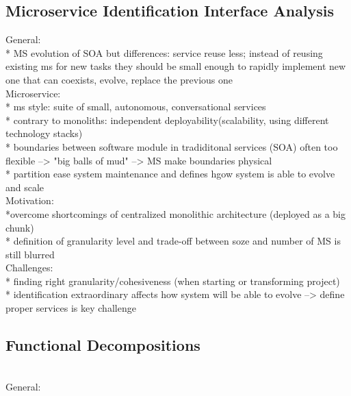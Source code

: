 \subsection{Microservice Identification Interface Analysis}
\cite{interfaceAnalysisBaresi}

General: \\
* MS evolution of SOA but differences: service reuse less; instead of reusing existing ms for new tasks they should be small enough to rapidly implement new one that can coexists, evolve, replace the previous one\\

Microservice:\\
* ms style: suite of small, autonomous, conversational services \\
* contrary to monoliths: independent deployability(scalability, using different technology stacks) \\
* boundaries between software module in tradiditonal services (SOA) often too flexible --> "big balls of mud" --> MS make boundaries physical\\
* partition ease system maintenance  and defines hgow system is able to evolve and scale \\



Motivation:\\
*overcome shortcomings of centralized monolithic architecture (deployed as a big chunk)\\
* definition of granularity level and trade-off between soze and number of MS is still blurred\\

Challenges: \\
* finding right granularity/cohesiveness (when starting or transforming project)\\
* identification extraordinary affects how system will be able to evolve --> define proper services is key challenge\\

\subsection{Functional Decompositions}
\cite{FunctionalDecompositionHeinrich}\\

General:\\


